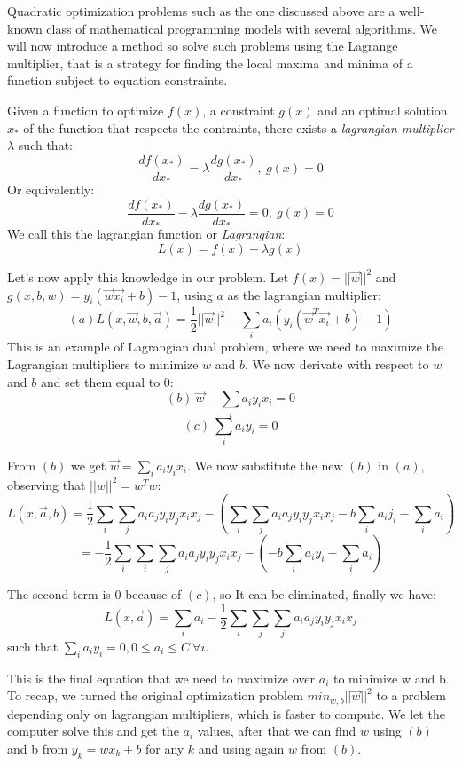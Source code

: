 \documentclass[11pt]{article}
\begin{document}
Quadratic optimization problems such as the one discussed above are a
well-known class of mathematical programming models with several
algorithms. We will now introduce a method so solve such problems using
the Lagrange multiplier, that is a strategy for finding the local maxima
and minima of a function subject to equation constraints.

Given a function to optimize \(f(x)\), a constraint \(g(x)\) and an
optimal solution \(x_*\) of the function that respects the contraints,
there exists a \emph{lagrangian multiplier} \(\lambda\) such that:
\[\frac{df(x_*)}{dx_*} = \lambda \frac{dg(x_*)}{dx_*},\ g(x) = 0\] Or
equivalently:
\[\frac{df(x_*)}{dx_*} - \lambda \frac{dg(x_*)}{dx_*} = 0,\ g(x) = 0\]
We call this the lagrangian function or \emph{Lagrangian}:
\[L(x) = f(x) - \lambda g(x)\]

Let's now apply this knowledge in our problem. Let
\(f(x)=||\vec{w}||^2\) and \(g(x, b, w)=y_i(\vec{w}\vec{x_i}+b)-1\),
using \(a\) as the lagrangian multiplier:
\[(a) L(x, \vec{w}, b, \vec{a}) = \frac{1}{2}||\vec{w}||^2 - \sum_i a_i (y_i(\vec{w}^T\vec{x_i} + b) - 1)\]
This is an example of Lagrangian dual problem, where we need to maximize
the Lagrangian multipliers to minimize \(w\) and \(b\). We now derivate
with respect to \(w\) and \(b\) and set them equal to \(0\):
\[(b)\ \vec{w} - \sum_i a_i y_i x_i = 0\] \[(c)\ \sum_i a_i y_i = 0\]

From \((b)\) we get \(\vec{w} = \sum_i a_i y_i x_i\). We now substitute
the new \((b)\) in \((a)\), observing that \(||w||^2 = w^Tw\):
\[L(x, \vec{a}, b) = \frac{1}{2}\sum_i \sum_j a_i a_j y_i y_j x_i x_j - (\sum_i \sum_j a_i a_j y_i y_j x_i x_j - b\sum_i a_i j_i - \sum_i a_i) \]
\[ = -\frac{1}{2}\sum_i \sum_i \sum_j a_i a_j y_i y_j x_i x_j - (-b\sum_i a_i y_i - \sum_i a_i) \]

The second term is \(0\) because of \((c)\), so It can be eliminated,
finally we have:
\[ L(x, \vec{a}) = \sum_i a_i -\frac{1}{2}\sum_i \sum_j \sum_j a_i a_j y_i y_j x_i x_j \]
such that \(\sum_i a_i y_i = 0, 0 \le a_i \le C\ \forall i\).

This is the final equation that we need to maximize over \(a_i\) to
minimize w and b. To recap, we turned the original optimization problem
\(min_{w, b} ||\vec{w}||^2\) to a problem depending only on lagrangian
multipliers, which is faster to compute. We let the computer solve this
and get the \(a_i\) values, after that we can find \(w\) using \((b)\)
and b from \(y_k = wx_k + b\) for any \(k\) and using again \(w\) from
\((b)\).
\end{document}
